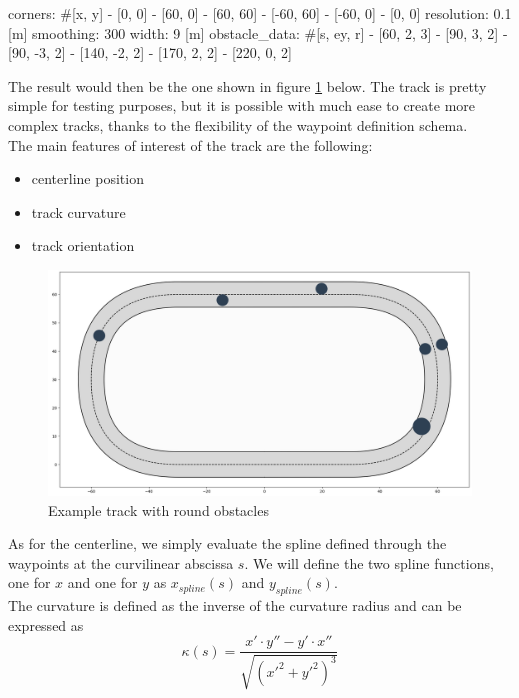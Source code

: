 \documentclass[a4paper, onecolumn, 12pt]{article}
\begin{document}
\begin{myverbatim}[title={Example of a track configuration file}]
corners: #[x, y]
    - [0, 0]
    - [60, 0]
    - [60, 60]
    - [-60, 60]
    - [-60, 0]
    - [0, 0]
resolution: 0.1 [m]
smoothing: 300 
width: 9 [m]
obstacle_data: #[s, ey, r]
    - [60, 2, 3]
    - [90,  3, 2]
    - [90, -3, 2]
    - [140, -2, 2]
    - [170, 2, 2]
    - [220, 0, 2]
\end{myverbatim}
\newpage 
The result would then be the one shown in figure \ref{ippodromo} below. The
track is pretty simple for testing purposes, but it is possible with much ease
to create more complex tracks, thanks to the flexibility of the waypoint
definition schema. \\
The main features of interest of the track are the following:
\begin{itemize}
    \item centerline position
    \item track curvature
    \item track orientation
\end{itemize}
\begin{figure}[h]
    \centering
    \includegraphics[width=\textwidth]{assets/ippodromo_obstacles.png}
    \caption{Example track with round obstacles}
    \label{ippodromo}
\end{figure} \vspace{0.5cm}
As for the centerline, we simply evaluate the spline defined through the
waypoints at the curvilinear abscissa $s$. We will define the two spline
functions, one for $x$ and one for $y$ as $x_{spline}(s)$ and $y_{spline}(s)$.\\
The curvature is defined as the inverse of the curvature radius and can be
expressed as
\begin{equation}
    \kappa(s) = \frac{x' \cdot y'' - y' \cdot x''}{\sqrt{(x'^2 + y'^2)^3}}
\end{equation}
\end{document}
